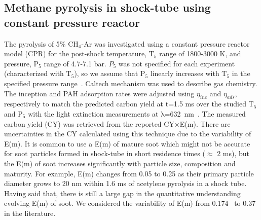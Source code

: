 \subsection{Methane pyrolysis in shock-tube using constant pressure reactor}
The pyrolysis of 5\% $\mathrm{CH_4}$-Ar was investigated using a constant pressure reactor model (CPR) for the post-shock temperature, $\mathrm{T_5}$ range of 1800-3000 K, and pressure, $\mathrm{P_5}$ range of 4.7-7.1 bar. $P_5$ was not specified for each experiment (characterized with $\mathrm{T_5}$), so we assume that $\mathrm{P_5}$ linearly increases with $\mathrm{T_5}$ in the specified pressure range~\citep{agafonov2016unified}. Caltech mechanism was used to describe gas chemistry. The inception and PAH adsorption rates were adjusted using $\eta_{inc}$ and $\eta_{ads}$, respectively to match the predicted carbon yield at t=1.5 ms over the studied $\mathrm{T_5}$ and $\mathrm{P_5}$ with the light extinction measurements at $\mathrm{\lambda}$=632~nm~\citep{agafonov2016unified}. The measured carbon yield (CY) was retrieved from the reported CY$\times$E(m). There are uncertainties in the CY calculated using this technique due to the variability of E(m). It is common to use a E(m) of mature soot which might not be accurate for soot particles formed in shock-tube in short residence times ($\approx$ 2 ms), but the E(m) of soot increases significantly with particle size, composition and maturity. For example, E(m) changes from 0.05 to 0.25 as their primary particle diameter grows to 20 nm within 1.6 ms of acetylene pyrolysis in a shock tube. Having said that, there is still a large gap in the quantitative understanding evolving E(m) of soot. We considered the variability of E(m) from 0.174~\citep{lee1981optical} to 0.37~\citep{agafonov2011soot} in the literature. 

